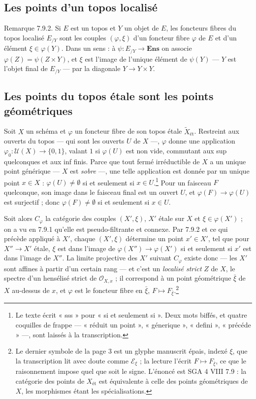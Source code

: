 \documentclass[11pt,a4paper]{article}
\begin{document}
\subsection*{Les points d'un topos localisé}

Remarque 7.9.2. Si $E$ est un topos et $Y$ un objet de $E$, les foncteurs
fibres du topos localisé $E_{/Y}$ sont les couples $(\varphi, \xi)$ d'un
foncteur fibre $\varphi$ de $E$ et d'un élément $\xi \in \varphi(Y)$. Dans un
sens : à $\psi : E_{/Y} \to \mathbf{Ens}$ on associe $\varphi(Z) = \psi(Z
\times Y)$, et $\xi$ est l'image de l'unique élément de $\psi(Y)$ — $Y$ est
l'objet final de $E_{/Y}$ — par la diagonale $Y \to Y \times Y$.

\subsection*{Les points du topos étale sont les points géométriques}

Soit $X$ un schéma et $\varphi$ un foncteur fibre de son topos étale
$\widetilde{X}_{\text{ét}}$. Restreint aux ouverts du topos — qui sont les
ouverts $U$ de $X$ —, $\varphi$ donne une application $\varphi_0 :
\mathcal{U}(X) \to \{0, 1\}$, valant $1$ si $\varphi(U)$ est non vide,
commutant aux sup quelconques et aux inf finis. Parce que tout fermé
irréductible de $X$ a un unique point générique — $X$ est \emph{sobre} —,
une telle application est donnée par un unique point $x \in X$ : $\varphi(U)
\neq \emptyset$ si et seulement si $x \in U$.\footnote{Le texte écrit « sss »
pour « si et seulement si ». Deux mots biffés, et quatre coquilles de frappe
— « réduit un point », « génerique », « defini », « précéde » —, sont
laissés à la transcription.} Pour un faisceau $F$ quelconque, son image dans
le faisceau final est un ouvert $U$, et $\varphi(F) \to \varphi(U)$ est
surjectif ; donc $\varphi(F) \neq \emptyset$ si et seulement si $x \in U$.

Soit alors $C_\varphi$ la catégorie des couples $(X', \xi)$, $X'$ étale sur
$X$ et $\xi \in \varphi(X')$ ; on a vu en 7.9.1 qu'elle est pseudo-filtrante
et connexe. Par 7.9.2 et ce qui précède appliqué à $X'$, chaque $(X', \xi)$
détermine un point $x' \in X'$, tel que pour $X'' \to X'$ étale, $\xi$ est
dans l'image de $\varphi(X'') \to \varphi(X')$ si et seulement si $x'$ est
dans l'image de $X''$. La limite projective des $X'$ suivant $C_\varphi$
existe donc — les $X'$ sont affines à partir d'un certain rang — et c'est un
\emph{localisé strict} $Z$ de $X$, le spectre d'un hensélisé strict de
$\mathcal{O}_{X,x}$ ; il correspond à un point géométrique $\bar\xi$ de $X$ au-dessus
de $x$, et $\varphi$ est le foncteur fibre en $\bar\xi$, $F \mapsto
F_{\bar\xi}$.\footnote{Le dernier symbole de la page 3 est un glyphe manuscrit
épais, indexé $\xi$, que la transcription lit avec doute comme
$\mathcal{E}_\xi$ ; la lecture l'écrit $F \mapsto F_{\bar\xi}$, ce que le
raisonnement impose quel que soit le signe. L'énoncé est SGA 4 VIII 7.9 : la
catégorie des points de $X_{\text{ét}}$ est équivalente à celle des points
géométriques de $X$, les morphismes étant les spécialisations.}
\end{document}
